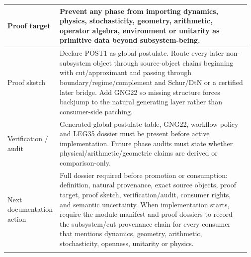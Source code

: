 \begin{longtable}{L{0.16\linewidth} L{0.81\linewidth}}
\hline\addlinespace[0.20em]
Proof target & Prevent any phase from importing dynamics, physics, stochasticity, geometry, arithmetic, operator algebra, environment or unitarity as primitive data beyond subsystem-being.\\
\hline\addlinespace[0.20em]
Proof sketch & Declare POST1 as global postulate. Route every later non-subsystem object through source-object chains beginning with cut/\allowbreak{}approximant and passing through boundary/\allowbreak{}regime/\allowbreak{}complement and Schur/\allowbreak{}DtN or a certified later bridge. Add GNG22 so missing structure forces backjump to the natural generating layer rather than consumer-side patching.\\
\hline\addlinespace[0.20em]
Verification /\allowbreak{} audit & Generated global-postulate table, GNG22, workflow policy and LEG35 dossier must be present before active implementation. Future phase audits must state whether physical/\allowbreak{}arithmetic/\allowbreak{}geometric claims are derived or comparison-only.\\
\hline\addlinespace[0.20em]
Next documentation action & Full dossier required before promotion or consumption: definition, natural provenance, exact source objects, proof target, proof sketch, verification/\allowbreak{}audit, consumer rights, and semantic uncertainty. When implementation starts, require the module manifest and proof dossiers to record the subsystem/\allowbreak{}cut provenance chain for every consumer that mentions dynamics, geometry, arithmetic, stochasticity, openness, unitarity or physics.\\
\hline\addlinespace[0.20em]
\end{longtable}
